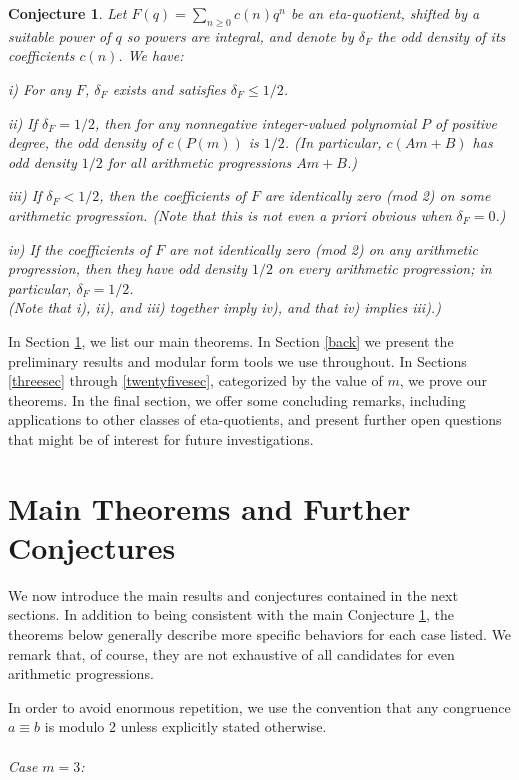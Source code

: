 \documentclass[12pt]{amsart}
\newtheorem{conjecture}[theorem]{Conjecture}
\theoremstyle{definition}
\begin{document}
\begin{conjecture}\label{mainconj}
Let $F(q)=\sum_{n\ge 0} c(n)q^n$ be an eta-quotient, shifted by a suitable power of $q$ so powers are integral, and denote by $\delta_F$ the odd density of its coefficients $c(n)$. We have:

i) For any $F$, $\delta_F$ exists and satisfies $\delta_F\le 1/2$.

ii) If $\delta_F= 1/2$, then for any nonnegative integer-valued polynomial $P$ of positive degree, the odd density of $c(P(m))$ is $1/2$. (In particular, $c(Am+B)$ has odd density $1/2$ for all arithmetic progressions $Am+B$.)

iii) If $\delta_F< 1/2$, then the coefficients of $F$ are identically zero (mod 2) on some arithmetic progression. (Note that this is not even \emph{a priori} obvious when $\delta_F=0$.)

iv) If the coefficients of $F$ are not identically zero (mod 2) on \emph{any} arithmetic progression, then they have odd density $1/2$ on \emph{every} arithmetic progression; in particular, $\delta_F= 1/2$.\\(Note that i), ii), and iii) together imply iv), and that iv) implies iii).)
\end{conjecture}

In Section \ref{listing}, we list our main theorems.  In Section \ref{back} we present the preliminary results and modular form tools we use throughout.  In Sections \ref{threesec} through \ref{twentyfivesec}, categorized by the value of $m$, we prove our theorems.  In the final section, we offer some concluding remarks, including applications to other classes of eta-quotients, and present further open questions that might be of interest for future investigations.

\section{Main Theorems and Further Conjectures}\label{listing}

We now introduce the main results and conjectures contained in the next sections. In addition to being consistent with the main Conjecture \ref{mainconj}, the theorems below generally describe more specific behaviors for each case listed.  We remark that, of course, they are not exhaustive of all candidates for even arithmetic progressions.

In order to avoid enormous repetition, we use the convention that any congruence $a \equiv b$ is modulo 2 unless explicitly stated otherwise.\\
\\
\noindent \emph{Case $m = 3$:} 
\end{document}
